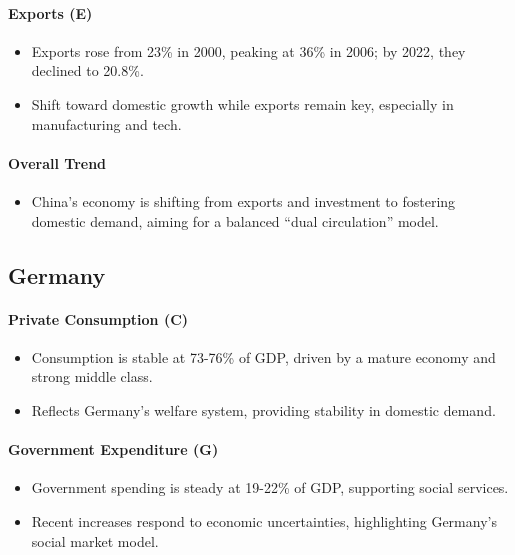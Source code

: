 \documentclass[a4paper,12pt]{extarticle} %
\begin{document}
\paragraph{Exports (E)}
\begin{itemize}
    \item Exports rose from 23\% in 2000, peaking at 36\% in 2006; by 2022, they declined to 20.8\%.
    \item Shift toward domestic growth while exports remain key, especially in manufacturing and tech.
\end{itemize}

\paragraph{Overall Trend}
\begin{itemize}
    \item China’s economy is shifting from exports and investment to fostering domestic demand, aiming for a balanced “dual circulation” model.
\end{itemize}

\subsection{Germany}

\paragraph{Private Consumption (C)}
\begin{itemize}
    \item Consumption is stable at 73-76\% of GDP, driven by a mature economy and strong middle class.
    \item Reflects Germany’s welfare system, providing stability in domestic demand.
\end{itemize}

\paragraph{Government Expenditure (G)}
\begin{itemize}
    \item Government spending is steady at 19-22\% of GDP, supporting social services.
    \item Recent increases respond to economic uncertainties, highlighting Germany’s social market model.
\end{itemize}
\end{document}
